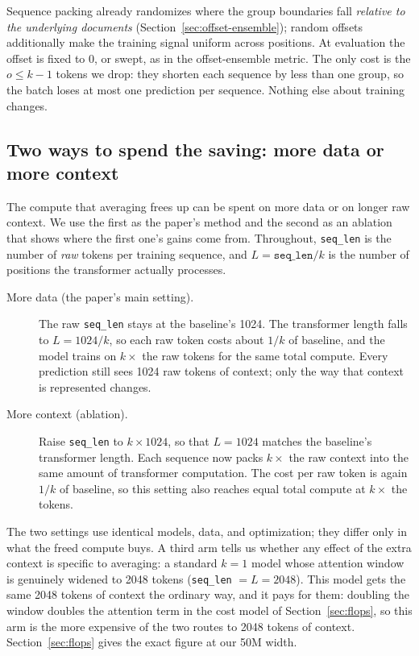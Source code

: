 \documentclass[11pt]{article}
\newcommand{\Ltr}{L}            %
\begin{document}
Sequence packing already randomizes where the group boundaries fall
\emph{relative to the underlying documents} (Section~\ref{sec:offset-ensemble});
random offsets additionally make the training signal uniform across
positions. At evaluation the offset is fixed to 0, or swept, as in the
offset-ensemble metric. The only cost is the $o \le k{-}1$ tokens we drop:
they shorten each sequence by less than one group, so the batch loses at most
one prediction per sequence. Nothing else about training changes.

\subsection{Two ways to spend the saving: more data or more context}
\label{sec:configs}

The compute that averaging frees up can be spent on more data or on longer
raw context. We use the first as the paper's method and the second as an
ablation that shows where the first one's gains come from. Throughout,
\texttt{seq\_len} is the number of \emph{raw} tokens per training sequence,
and $\Ltr = \texttt{seq\_len}/k$ is the number of positions the transformer
actually processes.

\begin{description}
  \item[More data (the paper's main setting).] The raw \texttt{seq\_len}
        stays at the baseline's 1024. The transformer length falls to
        $\Ltr = 1024/k$, so each raw token costs about $1/k$ of baseline, and
        the model trains on $k\times$ the raw tokens for the same total
        compute. Every prediction still sees 1024 raw tokens of context; only
        the way that context is represented changes.
  \item[More context (ablation).] Raise \texttt{seq\_len} to $k \times 1024$,
        so that $\Ltr = 1024$ matches the baseline's transformer length. Each
        sequence now packs $k\times$ the raw context into the same amount of
        transformer computation. The cost per raw token is again $1/k$ of
        baseline, so this setting also reaches equal total compute at
        $k\times$ the tokens.
\end{description}

The two settings use identical models, data, and optimization; they differ
only in what the freed compute buys. A third arm tells us whether any effect
of the extra context is specific to averaging: a standard $k{=}1$ model whose
attention window is genuinely widened to 2048 tokens (\texttt{seq\_len} $=
\Ltr = 2048$). This model gets the same 2048 tokens of context the ordinary
way, and it pays for them: doubling the window doubles the attention term in
the cost model of Section~\ref{sec:flops}, so this arm is the more expensive
of the two routes to 2048 tokens of context. Section~\ref{sec:flops} gives the
exact figure at our 50M width.
\end{document}
